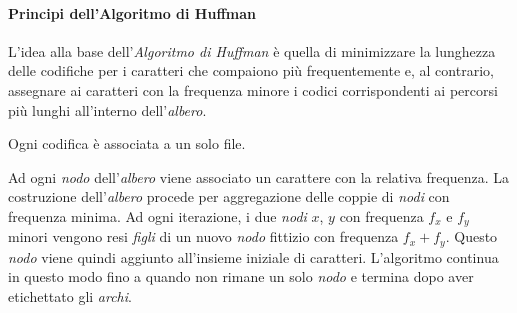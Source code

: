 \paragraph{Principi dell'Algoritmo di Huffman}
L'idea alla base dell'\emph{Algoritmo di Huffman} è quella di minimizzare la
lunghezza delle codifiche per i caratteri che compaiono più frequentemente e,
al contrario, assegnare ai caratteri con la frequenza minore i codici
corrispondenti ai percorsi più lunghi all'interno dell'\emph{albero}.

\begin{note}
    Ogni codifica è associata a un solo file.
\end{note}

\noindent
Ad ogni \emph{nodo} dell'\emph{albero} viene associato un carattere con la
relativa frequenza. La costruzione dell'\emph{albero} procede per aggregazione
delle coppie di \emph{nodi} con frequenza minima. Ad ogni iterazione, i due
\emph{nodi} $x$, $y$ con frequenza $f_x$ e $f_y$ minori vengono resi
\emph{figli} di un nuovo \emph{nodo} fittizio con frequenza $f_x+f_y$. Questo
\emph{nodo} viene quindi aggiunto all'insieme iniziale di caratteri. L'algoritmo
continua in questo modo fino a quando non rimane un solo \emph{nodo} e termina
dopo aver etichettato gli \emph{archi}.

